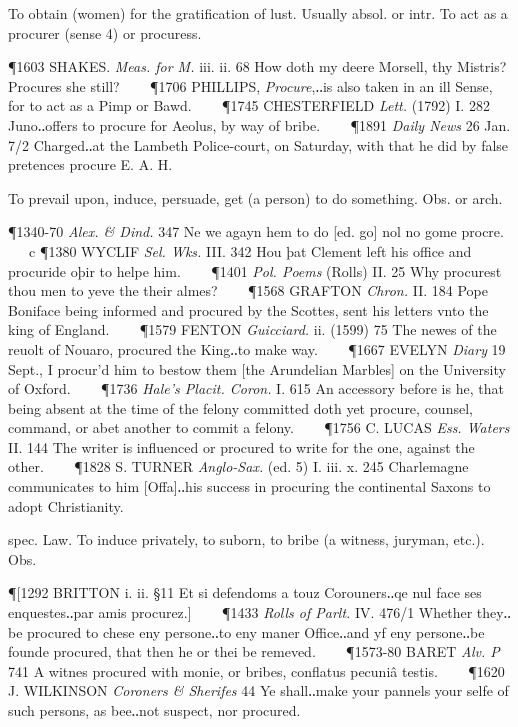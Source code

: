 \begin{description}[wide, labelwidth=!, labelindent=0pt]
\begin{myenumerate}
 To obtain (women) for the gratification of lust. Usually absol. or intr. To act as a procurer (sense 4) or procuress.

\P 1603 SHAKES.  \textit{Meas. for M.} iii. ii. 68 How doth my deere Morsell, thy Mistris? Procures she still?    
\P 1706 PHILLIPS,  \textit{Procure},‥is also taken in an ill Sense, for to act as a Pimp or Bawd.    
\P 1745 CHESTERFIELD  \textit{Lett.} (1792) I. 282 Juno‥offers to procure for Aeolus, by way of bribe.    
\P 1891  \textit{Daily News} 26 Jan. 7/2 Charged‥at the Lambeth Police-court, on Saturday, with that he did by false pretences procure E. A. H.

 To prevail upon, induce, persuade, get (a person) to do something. Obs. or arch.

\P 1340-70 \textit{Alex. \& Dind. } 347 Ne we agayn hem to do [ed. go] nol no gome procre.    c 
\P 1380 WYCLIF  \textit{Sel. Wks.} III. 342 Hou þat Clement left his office and procuride oþir to helpe him.    
\P 1401  \textit{Pol. Poems} (Rolls) II. 25 Why procurest thou men to yeve the their almes?    
\P 1568 GRAFTON  \textit{Chron.} II. 184 Pope Boniface being informed and procured by the Scottes, sent his letters vnto the king of England.    
\P 1579 FENTON  \textit{Guicciard.} ii. (1599) 75 The newes of the reuolt of Nouaro, procured the King‥to make way.    
\P 1667 EVELYN  \textit{Diary} 19 Sept., I procur'd him to bestow them [the Arundelian Marbles] on the University of Oxford.    
\P 1736 \textit{Hale's  Placit. Coron.} I. 615 An accessory before is he, that being absent at the time of the felony committed doth yet procure, counsel, command, or abet another to commit a felony.    
\P 1756 C. LUCAS  \textit{Ess. Waters} II. 144 The writer is influenced or procured to write for the one, against the other.    
\P 1828 S. TURNER  \textit{Anglo-Sax.} (ed. 5) I. iii. x. 245 Charlemagne communicates to him [Offa]‥his success in procuring the continental Saxons to adopt Christianity.

 spec. Law. To induce privately, to suborn, to bribe (a witness, juryman, etc.). Obs.

\P [1292 BRITTON  i. ii. §11 Et si defendoms a touz Corouners‥qe nul face ses enquestes‥par amis procurez.]    
\P 1433  \textit{Rolls of Parlt.} IV. 476/1 Whether they‥be procured to chese eny persone‥to eny maner Office‥and yf eny persone‥be founde procured, that then he or thei be remeved.    
\P 1573-80 BARET  \textit{Alv. P} 741 A witnes procured with monie, or bribes, conflatus pecuniâ testis.    
\P 1620 J. WILKINSON  \textit{Coroners \& Sherifes} 44 Ye shall‥make your pannels your selfe of such persons, as bee‥not suspect, nor procured.


\end{myenumerate}
\end{description}

